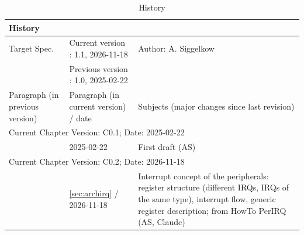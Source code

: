 \begin{table}[H]
\caption{History}
\label{tab:arch_history03}
\centering
\begin{tabularx}{\textwidth}{|X |X |X |}
  \hline
  \multicolumn{3}{|l|}{History} \\
  \hline
  \multicolumn{1}{|l}{Target Spec.} & \multicolumn{1}{l}{Current version : 1.1, 2026-11-18} & \multicolumn{1}{l|}{Author: A. Siggelkow}\\
  \multicolumn{1}{|l}{ } & \multicolumn{1}{l}{Previous version : 1.0, 2025-02-22} & \multicolumn{1}{l|}{ }\\
  \hline
  \hline
  Paragraph (in previous version) & Paragraph (in current version) / date & Subjects (major changes since last revision) \\
  \hline
  \hline
  \multicolumn{3}{|l|}{Current Chapter Version: C0.1; Date: 2025-02-22} \\
  \hline
  & 2025-02-22 & First draft (AS) \\
  \hline
  \multicolumn{3}{|l|}{Current Chapter Version: C0.2; Date: 2026-11-18} \\
  \hline
  & \ref{sec:archirq} / 2026-11-18 & Interrupt concept of the peripherals: register structure (different IRQs, IRQs of the same type), interrupt flow, generic register description; from HowTo PerIRQ (AS, Claude) \\
  \hline
\end{tabularx}
\end{table}
